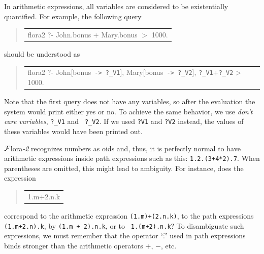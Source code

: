 \documentclass[11pt]{article}
\newcommand{\FLORA}{{\mbox{\sc ${\cal F}${lora}\rm\emph{-2}}}\xspace}
\newcommand{\FLSYSTEM}{\FLORA}
\newcommand{\prompt}{flora2 ?- }
\newenvironment{qrules}{\begin{quote}\tt\begin{tabular}[t]{l}}%
{\end{tabular}\end{quote}}
\newcommand{\mvd}{{\mbox{\tt \,->\,}}}  %
\begin{document}
In arithmetic expressions, all variables are considered to be
existentially quantified. For example, the following query
\begin{qrules}
\prompt John.bonus $+$ Mary.bonus $>$ 1000.
\end{qrules}
should be understood as
\begin{qrules}
\prompt John[bonus{\mvd}{\tt ?\_V1}], Mary[bonus{\mvd}{\tt ?\_V2}], {\tt ?\_V1}+{\tt ?\_V2} > 1000.
\end{qrules}
Note that the first query does not have any variables, so after the
evaluation the system would print either yes or no. To achieve the same
behavior, we use \emph{don't care variables}, {\tt ?\_V1} and {\tt
  ?\_V2}. If we used {\tt ?V1} and {\tt ?V2} instead, the values of these
variables would have been printed out.

\FLSYSTEM recognizes numbers as oids and, thus, it is perfectly normal to have
arithmetic expressions inside path expressions such as this:
{\tt 1.2.(3+4*2).7}. When parentheses are omitted, this might lead to
ambiguity.
For instance, does the expression
\begin{qrules}
1.m+2.n.k
\end{qrules}
correspond to
the arithmetic expression {\tt (1.m)+(2.n.k)}, to
the path expressions {\tt (1.m+2.n).k}, by {\tt (1.m + 2).n.k}, or to {\tt
  1.(m+2).n.k}? To disambiguate such expressions, we must remember that the
operator ``.'' used in path expressions binds stronger than the
arithmetic operators $+$, $-$, etc.
\end{document}
